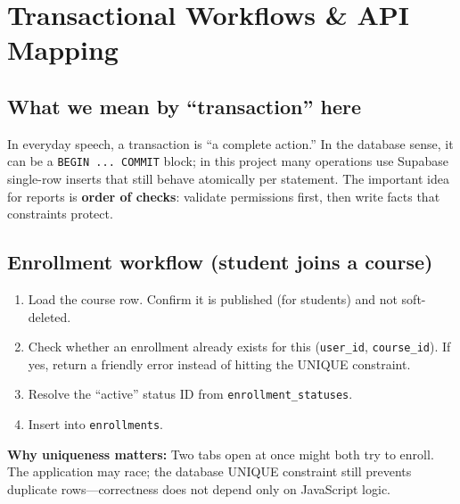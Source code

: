 
\chapter{Transactional Workflows \& API Mapping}
\label{ch:tx}

\section{What we mean by ``transaction'' here}
In everyday speech, a transaction is ``a complete action.'' In the database sense, it can be a \texttt{BEGIN ... COMMIT} block; in this project many operations use Supabase single-row inserts that still behave atomically per statement. The important idea for reports is \textbf{order of checks}: validate permissions first, then write facts that constraints protect.

\section{Enrollment workflow (student joins a course)}
\begin{enumerate}[leftmargin=*]
  \item Load the course row. Confirm it is published (for students) and not soft-deleted.

  \item Check whether an enrollment already exists for this (\texttt{user\_id}, \texttt{course\_id}). If yes, return a friendly error instead of hitting the UNIQUE constraint.

  \item Resolve the ``active'' status ID from \texttt{enrollment\_statuses}.

  \item Insert into \texttt{enrollments}.
\end{enumerate}

\textbf{Why uniqueness matters:} Two tabs open at once might both try to enroll. The application may race; the database UNIQUE constraint still prevents duplicate rows---correctness does not depend only on JavaScript logic.


